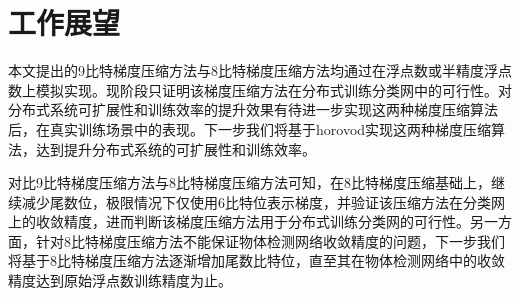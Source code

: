 \section{工作展望}
本文提出的9比特梯度压缩方法与8比特梯度压缩方法均通过在浮点数或半精度浮点数上模拟实现。现阶段只证明该梯度压缩方法在分布式训练分类网中的可行性。对分布式系统可扩展性和训练效率的提升效果有待进一步实现这两种梯度压缩算法后，在真实训练场景中的表现。下一步我们将基于horovod实现这两种梯度压缩算法，达到提升分布式系统的可扩展性和训练效率。

对比9比特梯度压缩方法与8比特梯度压缩方法可知，在8比特梯度压缩基础上，继续减少尾数位，极限情况下仅使用6比特位表示梯度，并验证该压缩方法在分类网上的收敛精度，进而判断该梯度压缩方法用于分布式训练分类网的可行性。另一方面，针对8比特梯度压缩方法不能保证物体检测网络收敛精度的问题，下一步我们将基于8比特梯度压缩方法逐渐增加尾数比特位，直至其在物体检测网络中的收敛精度达到原始浮点数训练精度为止。